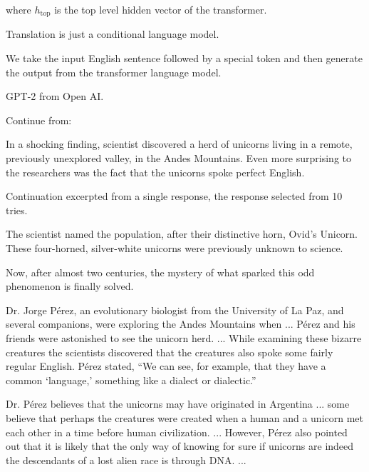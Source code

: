 {\vfill
where $h_\mathrm{top}$ is the top level hidden vector of the transformer.


Translation is just a conditional language model.

\vfill
We take the input English sentence followed by a special token and then generate the output from the transformer language model.



GPT-2 from Open AI.

\vfill
{\color{red} Continue from:}

\vfill
In a shocking finding, scientist discovered a herd of unicorns living in a remote, previously unexplored valley, in the Andes Mountains. Even more surprising to the researchers was the fact that the unicorns spoke perfect English.


{\color{red} Continuation excerpted from a single response, the response selected from 10 tries.}

\bigskip

The scientist named the population, after their distinctive horn, Ovid’s Unicorn. These four-horned, silver-white unicorns were previously unknown to science.

Now, after almost two centuries, the mystery of what sparked this odd phenomenon is finally solved.

Dr. Jorge Pérez, an evolutionary biologist from the University of La Paz, and several companions, were exploring the Andes Mountains when ...
Pérez and his friends were astonished to see the unicorn herd. ...
While examining these bizarre creatures the scientists discovered that the creatures also spoke some fairly regular English. Pérez stated, “We can see, for example, that they have a common ‘language,’ something like a dialect or dialectic.”

Dr. Pérez believes that the unicorns may have originated in Argentina ... some believe that perhaps the creatures were created when a human and a unicorn met each other in a time before human civilization. ... However, Pérez also pointed out that it is likely that the only way of knowing for sure if unicorns are indeed the descendants of a lost alien race is through DNA. ...


}

